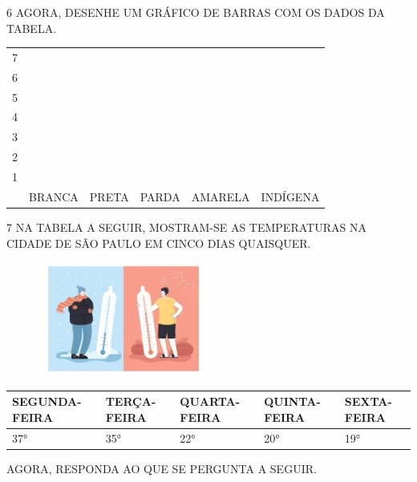 
\num{6} AGORA, DESENHE UM GRÁFICO DE BARRAS COM OS DADOS DA TABELA.

\begin{longtable}[]{@{}llllll@{}}
\toprule
7 & & & & &\tabularnewline
6 & & & & &\tabularnewline
5 & & & & &\tabularnewline
4 & & & & &\tabularnewline
3 & & & & &\tabularnewline
2 & & & & &\tabularnewline
1 & & & & &\tabularnewline
& BRANCA & PRETA & PARDA & AMARELA & INDÍGENA\tabularnewline
\bottomrule
\end{longtable}


\num{7} NA TABELA A SEGUIR, MOSTRAM-SE AS TEMPERATURAS NA CIDADE DE SÃO PAULO EM CINCO
DIAS QUAISQUER.


\begin{figure}[htpb!]
\centering
\includegraphics[width=2.20878in,height=1.47139in]{media/image104.jpg}
\end{figure}

\begin{longtable}[]{@{}lllll@{}}
\toprule
SEGUNDA-FEIRA & TERÇA-FEIRA & QUARTA-FEIRA & QUINTA-FEIRA & SEXTA-FEIRA\tabularnewline
\midrule
\endhead
37° & 35° & 22° & 20° & 19°\tabularnewline
\bottomrule
\end{longtable}

AGORA, RESPONDA AO QUE SE PERGUNTA A SEGUIR.


